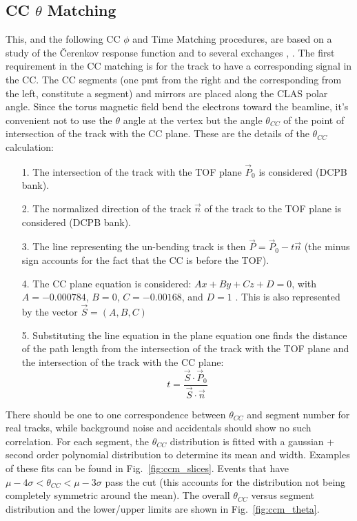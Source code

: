\clearpage\newpage
\subsection{CC $\theta$ Matching}
This, and the following CC $\phi$ and Time Matching procedures, are based on a study
\cite{bib:ccmatch} of the \v Cerenkov response function and to several exchanges
\cite{bib:pc_fxpun}, \cite{bib:pc_osi}.
The first requirement in the CC matching is for the track to have a corresponding
signal in the CC. The CC segments (one pmt from the right and the corresponding from the left,
constitute a segment) and mirrors are placed along the CLAS polar angle.
Since the torus magnetic field bend the electrons toward the beamline, it's convenient
not to use the $\theta$ angle at the vertex but the angle $\theta_{CC}$ of the point of
intersection of the track with the CC plane. These are the details of the  $\theta_{CC}$
calculation:
\begin{itemize}
 \item [1.] The intersection of the track with the TOF plane  $\vec{P}_0$ is considered (DCPB bank).
 \item [2.] The normalized direction of the track $\vec{n}$ of the track to the TOF plane is considered (DCPB bank).
 \item [3.] The line representing the un-bending track is then $\vec{P} = \vec{P}_0 - t\vec{n}$
            (the minus sign accounts for the fact that the CC is before the TOF).
 \item [4.] The CC plane equation is considered: $Ax+By+Cz+D=0$, with
            $A=-0.000784$, $B=0$, $C=-0.00168$, and $D=1$ \cite{bib:ccmatch}. This is also represented
            by the vector $\vec{S} = (A, B, C)$
 \item [5.] Substituting the line equation in the plane equation one finds the distance of the path length from the
	         intersection of the track with the TOF plane and the intersection of the track with the CC plane:
            $$t=\frac{\vec{S} \cdot \vec{P}_0}{\vec{S} \cdot \vec{n}}$$
\end{itemize}
There should be one to one correspondence between $\theta_{CC}$ and segment number for real tracks, while
background noise and accidentals should show no such correlation.
For each segment, the $\theta_{CC}$ distribution is fitted with a gaussian + second order
polynomial distribution to determine its mean and width. Examples of these fits can be found
in Fig.~\ref{fig:ccm_slices}. Events that have $\mu - 4\sigma < \theta_{CC} < \mu - 3\sigma$
pass the cut (this accounts for the distribution not being completely symmetric around the mean).
The overall $\theta_{CC}$ versus segment distribution and the lower/upper limits
are shown in Fig.~\ref{fig:ccm_theta}.

